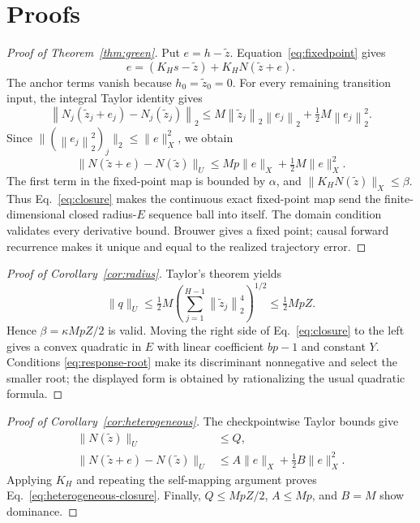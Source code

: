 \documentclass{article}
\newcommand{\norm}[1]{\left\lVert #1\right\rVert_2}
\begin{document}
\appendix
\raggedbottom

\section{Proofs}
\label{app:proofs}

\begin{proof}[Proof of Theorem~\ref{thm:green}]
Put $e=h-\widetilde z$.  Equation~\eqref{eq:fixedpoint} gives
\begin{equation}
 e=(K_Hs-\widetilde z)+K_HN(\widetilde z+e).
\end{equation}
The anchor terms vanish because $h_0=\widetilde z_0=0$.  For every remaining
transition input, the integral Taylor identity gives
\begin{equation}
 \norm{N_j(\widetilde z_j+e_j)-N_j(\widetilde z_j)}
 \le M\norm{\widetilde z_j}\norm{e_j}
 +\tfrac12M\norm{e_j}^2.
\end{equation}
Since
$\| (\norm{e_j}^2)_j\|_2\le\|e\|_X^2$, we obtain
\begin{equation}
 \|N(\widetilde z+e)-N(\widetilde z)\|_U
 \le Mp\|e\|_X+\tfrac12M\|e\|_X^2.
\end{equation}
The first term in the fixed-point map is bounded by $\alpha$, and
$\|K_HN(\widetilde z)\|_X\le\beta$.  Thus Eq.~\eqref{eq:closure} makes the
continuous exact fixed-point map send the finite-dimensional closed
radius-$E$ sequence ball into itself.  The domain condition validates every
derivative bound.  Brouwer gives a fixed point; causal forward recurrence makes
it unique and equal to the realized trajectory error.
\end{proof}

\begin{proof}[Proof of Corollary~\ref{cor:radius}]
Taylor's theorem yields
\begin{equation}
 \|q\|_U\le\tfrac12M
 \left(\sum_{j=1}^{H-1}\norm{\widetilde z_j}^4\right)^{1/2}
 \le\tfrac12MpZ.
\end{equation}
Hence $\beta=\kappa MpZ/2$ is valid.  Moving the right side of
Eq.~\eqref{eq:closure} to the left gives a convex quadratic in $E$ with
linear coefficient $bp-1$ and constant $Y$.  Conditions
\eqref{eq:response-root} make its discriminant nonnegative and select the
smaller root; the displayed form is obtained by rationalizing the usual
quadratic formula.
\end{proof}

\begin{proof}[Proof of Corollary~\ref{cor:heterogeneous}]
The checkpointwise Taylor bounds give
\begin{align}
 \|N(\widetilde z)\|_U&\le Q,\\
 \|N(\widetilde z+e)-N(\widetilde z)\|_U
 &\le A\|e\|_X+\tfrac12B\|e\|_X^2.
\end{align}
Applying $K_H$ and repeating the self-mapping argument proves
Eq.~\eqref{eq:heterogeneous-closure}.  Finally,
$Q\le MpZ/2$, $A\le Mp$, and $B=M$ show dominance.
\end{proof}
\end{document}

